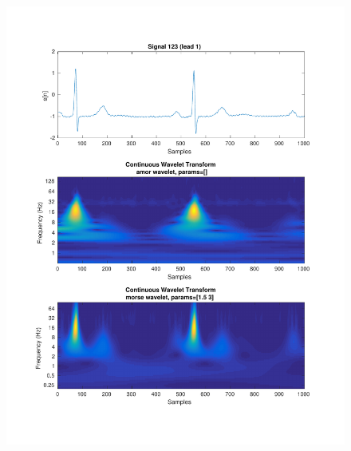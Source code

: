 \documentclass{beamer}
\begin{document}
\begin{frame}
\begin{columns}
\begin{figure}
\includegraphics[width=\textwidth]{fig/123l1_cwt.pdf}
\end{figure}
\end{columns}
\end{frame}
\end{document}

